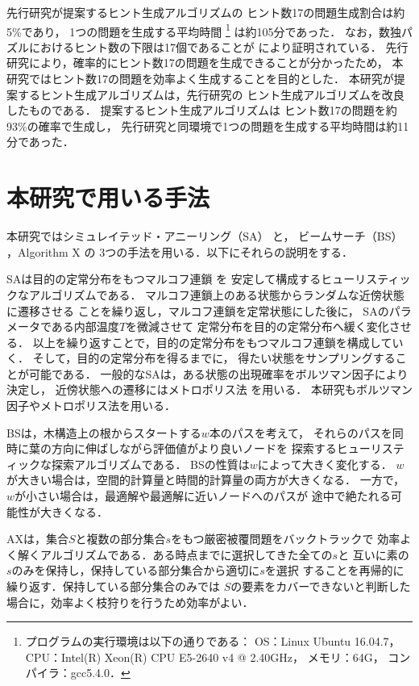 \documentclass[a4paper, 9pt]{jarticle}
\begin{document}
\begin{論文概要}
先行研究が提案するヒント生成アルゴリズムの
ヒント数17の問題生成割合は約5\%であり，
1つの問題を生成する平均時間
\footnote{プログラムの実行環境は以下の通りである： 
OS：Linux Ubuntu 16.04.7，
CPU：Intel(R) Xeon(R) CPU E5-2640 v4 @ 2.40GHz，
メモリ：64G，
コンパイラ：gcc5.4.0．
}
は約105分であった．
なお，数独パズルにおけるヒント数の下限は17個であることが 
\cite{seventeen_hints} により証明されている．
先行研究により，確率的にヒント数17の問題を生成できることが分かったため，
本研究ではヒント数17の問題を効率よく生成することを目的とした．
本研究が提案するヒント生成アルゴリズムは，先行研究の
ヒント生成アルゴリズムを改良したものである．
提案するヒント生成アルゴリズムは
ヒント数17の問題を約93\%の確率で生成し，
先行研究と同環境で1つの問題を生成する平均時間は約11分であった．

\section{本研究で用いる手法}
本研究ではシミュレイテッド・アニーリング（SA） \cite{sa} と，
ビームサーチ（BS） \cite{beam_search}，Algorithm X \cite{AX} の
3つの手法を用いる．以下にそれらの説明をする．

SAは目的の定常分布をもつマルコフ連鎖 \cite{mcmc} を
安定して構成するヒューリスティックなアルゴリズムである．
マルコフ連鎖上のある状態からランダムな近傍状態に遷移させる
ことを繰り返し，マルコフ連鎖を定常状態にした後に，
SAのパラメータである内部温度$T$を微減させて
定常分布を目的の定常分布へ緩く変化させる．
以上を繰り返すことで，目的の定常分布をもつマルコフ連鎖を構成していく．
そして，目的の定常分布を得るまでに，
得たい状態をサンプリングすることが可能である．
一般的なSAは，ある状態の出現確率をボルツマン因子により決定し，
近傍状態への遷移にはメトロポリス法 \cite{sa} を用いる．
本研究もボルツマン因子やメトロポリス法を用いる．

BSは，木構造上の根からスタートする$w$本のパスを考えて，
それらのパスを同時に葉の方向に伸ばしながら評価値がより良いノードを
探索するヒューリスティックな探索アルゴリズムである．
BSの性質は$w$によって大きく変化する．
$w$が大きい場合は，空間的計算量と時間的計算量の両方が大きくなる．
一方で，$w$が小さい場合は，最適解や最適解に近いノードへのパスが
途中で絶たれる可能性が大きくなる．

AXは，集合$S$と複数の部分集合$s$をもつ厳密被覆問題をバックトラックで
効率よく解くアルゴリズムである．ある時点までに選択してきた全ての$s$と
互いに素の$s$のみを保持し，保持している部分集合から適切に$s$を選択
することを再帰的に繰り返す．保持している部分集合のみでは
$S$の要素をカバーできないと判断した場合に，効率よく枝狩りを行うため効率がよい．


\end{論文概要}
\end{document}
